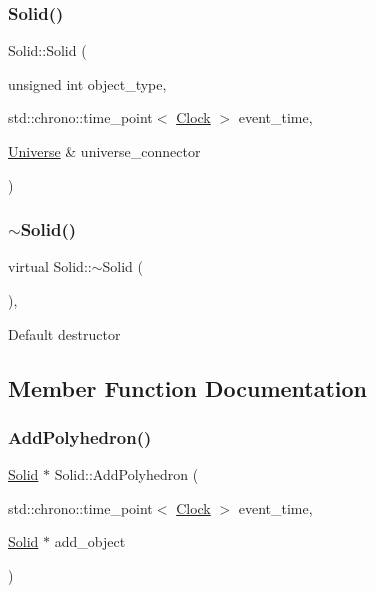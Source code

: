 \mbox{\label{classSolid_a80746ad255dded6090e648fc3f0dbd93}} 
\subsubsection{\texorpdfstring{Solid()}{Solid()}\hspace{0.1cm}{\footnotesize\ttfamily [4/4]}}
{\footnotesize\ttfamily Solid\+::\+Solid (\begin{DoxyParamCaption}\item[{unsigned int}]{object\+\_\+type,  }\item[{std\+::chrono\+::time\+\_\+point$<$ \mbox{\hyperlink{universe_8h_a0ef8d951d1ca5ab3cfaf7ab4c7a6fd80}{Clock}} $>$}]{event\+\_\+time,  }\item[{\mbox{\hyperlink{classUniverse}{Universe}} \&}]{universe\+\_\+connector }\end{DoxyParamCaption})\hspace{0.3cm}{\ttfamily [inline]}}

\mbox{\label{classSolid_a07095e0808c0ef6b206bc70992ef557d}} 
\subsubsection{\texorpdfstring{$\sim$\+Solid()}{~Solid()}}
{\footnotesize\ttfamily virtual Solid\+::$\sim$\+Solid (\begin{DoxyParamCaption}{ }\end{DoxyParamCaption})\hspace{0.3cm}{\ttfamily [inline]}, {\ttfamily [virtual]}}

Default destructor 

\subsection{Member Function Documentation}
\mbox{\label{classSolid_a87a3b588f931ff20f09a5d46f6cb7907}} 
\subsubsection{\texorpdfstring{Add\+Polyhedron()}{AddPolyhedron()}}
{\footnotesize\ttfamily \mbox{\hyperlink{classSolid}{Solid}} $\ast$ Solid\+::\+Add\+Polyhedron (\begin{DoxyParamCaption}\item[{std\+::chrono\+::time\+\_\+point$<$ \mbox{\hyperlink{universe_8h_a0ef8d951d1ca5ab3cfaf7ab4c7a6fd80}{Clock}} $>$}]{event\+\_\+time,  }\item[{\mbox{\hyperlink{classSolid}{Solid}} $\ast$}]{add\+\_\+object }\end{DoxyParamCaption})}

